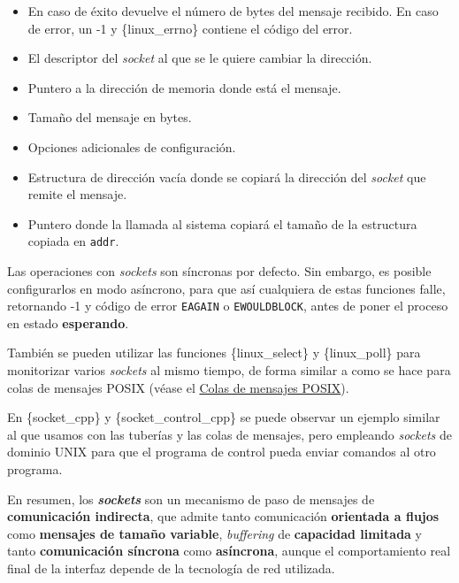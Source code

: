 \begin{itemize}
\item
  En caso de éxito devuelve el número de bytes del mensaje recibido. En
  caso de error, un -1 y \{linux\_errno\} contiene el código del error.
\item
  El descriptor del \emph{socket} al que se le quiere cambiar la
  dirección.
\item
  Puntero a la dirección de memoria donde está el mensaje.
\item
  Tamaño del mensaje en bytes.
\item
  Opciones adicionales de configuración.
\item
  Estructura de dirección vacía donde se copiará la dirección del
  \emph{socket} que remite el mensaje.
\item
  Puntero donde la llamada al sistema copiará el tamaño de la estructura
  copiada en \texttt{addr}.
\end{itemize}

Las operaciones con \emph{sockets} son síncronas por defecto. Sin
embargo, es posible configurarlos en modo asíncrono, para que así
cualquiera de estas funciones falle, retornando -1 y código de error
\texttt{EAGAIN} o \texttt{EWOULDBLOCK}, antes de poner el proceso en
estado \textbf{esperando}.

También se pueden utilizar las funciones \{linux\_select\} y
\{linux\_poll\} para monitorizar varios \emph{sockets} al mismo tiempo,
de forma similar a como se hace para colas de mensajes POSIX (véase el
\hyperref[_colas_de_mensajes_posix]{Colas de mensajes POSIX}).

En \{socket\_cpp\} y \{socket\_control\_cpp\} se puede observar un
ejemplo similar al que usamos con las tuberías y las colas de mensajes,
pero empleando \emph{sockets} de dominio UNIX para que el programa de
control pueda enviar comandos al otro programa.

En resumen, los \textbf{\emph{sockets}} son un mecanismo de paso de
mensajes de \textbf{comunicación indirecta}, que admite tanto
comunicación \textbf{orientada a flujos} como \textbf{mensajes de tamaño
variable}, \emph{buffering} de \textbf{capacidad limitada} y tanto
\textbf{comunicación síncrona} como \textbf{asíncrona}, aunque el
comportamiento real final de la interfaz depende de la tecnología de red
utilizada.
